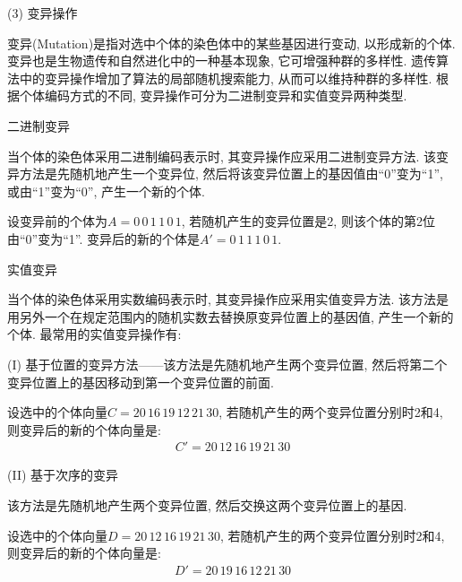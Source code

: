  (3) 变异操作

 变异(Mutation)是指对选中个体的染色体中的某些基因进行变动, 以形成新的个体. 变异也是生物遗传和自然进化中的一种基本现象, 它可增强种群的多样性. 遗传算法中的变异操作增加了算法的局部随机搜索能力, 从而可以维持种群的多样性. 根据个体编码方式的不同, 变异操作可分为二进制变异和实值变异两种类型.

  二进制变异

 当个体的染色体采用二进制编码表示时, 其变异操作应采用二进制变异方法. 该变异方法是先随机地产生一个变异位, 然后将该变异位置上的基因值由“0”变为“1”, 或由“1”变为“0”, 产生一个新的个体.

\begin{example}
设变异前的个体为$A=0\, 0 \, 1\,  1\,  0 \, 1$, 若随机产生的变异位置是2, 则该个体的第2位由“0”变为“1”.
变异后的新的个体是$A'= 0\,  1\,  1\,  1\,  0 \, 1$.
\end{example}

 实值变异

 当个体的染色体采用实数编码表示时, 其变异操作应采用实值变异方法. 该方法是用另外一个在规定范围内的随机实数去替换原变异位置上的基因值, 产生一个新的个体. 最常用的实值变异操作有:

(I) 基于位置的变异方法——该方法是先随机地产生两个变异位置, 然后将第二个变异位置上的基因移动到第一个变异位置的前面.

\begin{example}
设选中的个体向量$C=20\,  16\,  19\,  12\,  21\,  30$, 若随机产生的两个变异位置分别时2和4, 则变异后的新的个体向量是:
\begin{align}
    C'= 20\,  12 \, 16 \, 19\,  21\,  30
\end{align}
\vspace{-0.3cm}
\end{example}

(II) 基于次序的变异

该方法是先随机地产生两个变异位置, 然后交换这两个变异位置上的基因.

\begin{example}
    设选中的个体向量$D=20\,  12 \, 16 \, 19\,  21\,  30$, 若随机产生的两个变异位置分别时2和4, 则变异后的新的个体向量是:
\begin{align}
    D'= 20\,  19\,  16\,  12 \, 21 \, 30
\end{align}
\vspace{-0.3cm}
\end{example}

